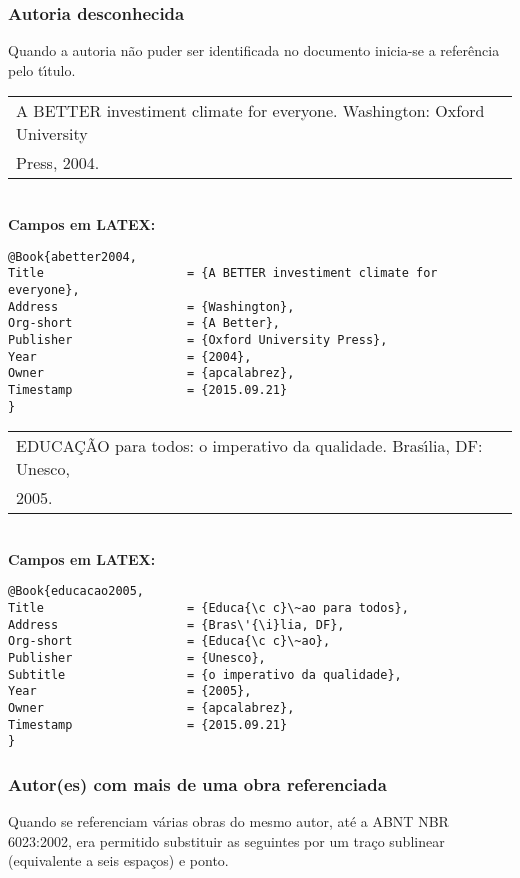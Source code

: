 \subsubsection{Autoria desconhecida} 

Quando a autoria n\~ao puder ser identificada no documento inicia-se a refer\^encia pelo t\'{\i}tulo.

\begin{tabular}{|l|c|} \hline
	A BETTER investiment climate for everyone. Washington: Oxford University \\ Press, 2004.\\\hline
\end{tabular}\\

\textbf{Campos em LATEX:}

\begin{verbatim}
@Book{abetter2004,
Title                    = {A BETTER investiment climate for everyone},
Address                  = {Washington},
Org-short                = {A Better},
Publisher                = {Oxford University Press},
Year                     = {2004},
Owner                    = {apcalabrez},
Timestamp                = {2015.09.21}
}
\end{verbatim}

\begin{tabular}{|l|c|} \hline
	EDUCA\c{C}\~AO para todos: o imperativo da qualidade. Bras\'{\i}lia, DF: Unesco,\\ 2005.\\\hline
\end{tabular}\\

\textbf{Campos em LATEX:}

\begin{verbatim}
@Book{educacao2005,
Title                    = {Educa{\c c}\~ao para todos},
Address                  = {Bras\'{\i}lia, DF},
Org-short                = {Educa{\c c}\~ao},
Publisher                = {Unesco},
Subtitle                 = {o imperativo da qualidade},
Year                     = {2005},
Owner                    = {apcalabrez},
Timestamp                = {2015.09.21}
}
\end{verbatim}

\subsubsection{Autor(es) com mais de uma obra referenciada } 

Quando se referenciam v\'arias obras do mesmo autor, at\'e a ABNT NBR 6023:2002, era permitido substituir as seguintes por um tra\c{c}o sublinear (equivalente a seis espa\c{c}os) e ponto.

